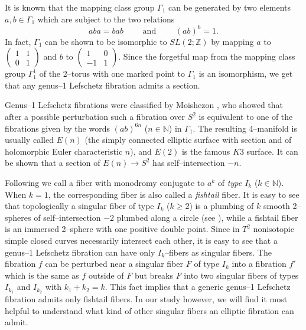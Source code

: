 \documentclass[11pt]{gtart}
\theoremstyle{definition}
\numberwithin{equation}{section}
\newcommand{\bfn}{{\mathbb {N}}}
\newcommand{\bfz}{{\mathbb {Z}}}
\begin{document}
It is known that the mapping class group $\Gamma _1$ can be generated by 
two elements $a,b\in \Gamma _1$ which are subject to the two relations
\[ 
aba=bab \qquad {\mbox{ and }} \qquad (ab)^6=1.
\]
In fact, $\Gamma _1$ can be shown to be isomorphic to $SL(2; \bfz )$ 
by mapping $a$ to 
$\left(\begin{smallmatrix}
 1 & 1 \\
 0 & 1 
\end{smallmatrix}\right)$ and $b$ to
$\left(\begin{smallmatrix}
 1 & 0 \\
 -1 & 1 
\end{smallmatrix}\right)$. 
Since the forgetful map from the mapping class group $\Gamma _1 ^1$ of the
2--torus with one marked point to $\Gamma _1$ is an isomorphism, we get that
any genus--1 Lefschetz fibration admits a section. 

Genus--1 Lefschetz fibrations were classified by Moishezon
\cite{Mois}, who showed that after a possible perturbation such a
fibration over $S^2$ is equivalent to one of the fibrations given by
the words $(ab)^{6n}$ ($n\in \bfn$) in $\Gamma _1$. The resulting
4--manifold is usually called $E(n)$ (the simply connected elliptic
surface with section and of holomorphic Euler characteristic $n$), and
$E(2)$ is the famous $K3$ surface.  It can be shown that a section of
$E(n)\to S^2$ has self--intersection $-n$.

Following \cite{HKK} we call a fiber with monodromy conjugate to $a^k$
of \emph{type $I_{k}$} ($k\in \bfn$).  When $k=1$, the corresponding
fiber is also called a \emph{fishtail} fiber.  It is easy to see that
topologically a singular fiber of type $I_k$ ($k\geq 2$) is a plumbing
of $k$ smooth 2--spheres of self--intersection $-2$ plumbed along a
circle (see \cite[page 35]{HKK}), while a fishtail fiber is an
immersed 2--sphere with one positive double point.  Since in $T^2$
nonisotopic simple closed curves necessarily intersect each other, it is
easy to see that a genus--1 Lefschetz fibration can have only
$I_k$--fibers as singular fibers. The fibration $f$ can be perturbed
near a singular fiber $F$ of type $I_k$ into a fibration $f'$ which is
the same as $f$ outside of $F$ but breaks $F$ into two singular fibers
of types $I_{k_1}$ and $I_{k_2}$ with $k_1+k_2=k$.  This fact implies
that a generic genus--1 Lefschetz fibration admits only fishtail
fibers. In our study however, we will find it most helpful to
understand what kind of other singular fibers an elliptic fibration
can admit.
\end{document}
